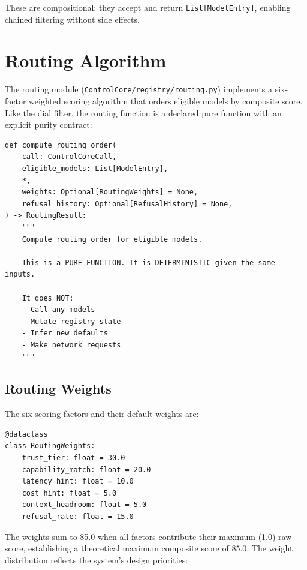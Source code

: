 \documentclass[11pt,a4paper]{article}
\theoremstyle{plain}
\theoremstyle{definition}
\begin{document}
These are compositional: they accept and return \texttt{List[ModelEntry]}, enabling
chained filtering without side effects.

\section{Routing Algorithm}
\label{sec:routing}

The routing module (\texttt{ControlCore/registry/routing.py}) implements a
six-factor weighted scoring algorithm that orders eligible models by composite
score. Like the dial filter, the routing function is a declared pure function
with an explicit purity contract:

\begin{lstlisting}[style=pythonstyle, caption={compute\_routing\_order purity contract from \texttt{routing.py}}]
def compute_routing_order(
    call: ControlCoreCall,
    eligible_models: List[ModelEntry],
    *,
    weights: Optional[RoutingWeights] = None,
    refusal_history: Optional[RefusalHistory] = None,
) -> RoutingResult:
    """
    Compute routing order for eligible models.

    This is a PURE FUNCTION. It is DETERMINISTIC given the same inputs.

    It does NOT:
    - Call any models
    - Mutate registry state
    - Infer new defaults
    - Make network requests
    """
\end{lstlisting}

\subsection{Routing Weights}

The six scoring factors and their default weights are:

\begin{lstlisting}[style=pythonstyle, caption={RoutingWeights from \texttt{routing.py}}]
@dataclass
class RoutingWeights:
    trust_tier: float = 30.0
    capability_match: float = 20.0
    latency_hint: float = 10.0
    cost_hint: float = 5.0
    context_headroom: float = 5.0
    refusal_rate: float = 15.0
\end{lstlisting}

The weights sum to 85.0 when all factors contribute their maximum (1.0) raw
score, establishing a theoretical maximum composite score of 85.0. The weight
distribution reflects the system's design priorities:
\end{document}
